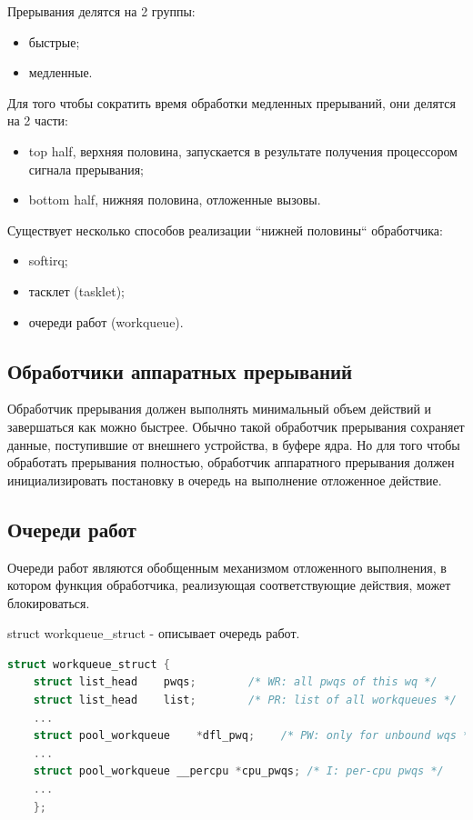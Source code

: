 Прерывания делятся на 2 группы:

\begin{itemize}
	\item быстрые;
	\item медленные. 
\end{itemize}

Для того чтобы сократить время обработки медленных прерываний, они делятся на 2 части:

\begin{itemize}
	\item top half, верхняя половина, запускается в результате получения процессором сигнала прерывания;
	\item bottom half, нижняя половина, отложенные вызовы.
\end{itemize}

Существует несколько способов реализации “нижней половины“
обработчика: 
\begin{itemize}
	\item softirq;
	\item тасклет (tasklet);
	\item очереди работ (workqueue).
\end{itemize}

\subsection{Обработчики аппаратных прерываний}

Обработчик прерывания должен выполнять минимальный объем действий и завершаться как можно быстрее.
Обычно такой обработчик прерывания сохраняет данные, поступившие от внешнего устройства, в буфере ядра. 
Но для того чтобы обработать прерывания полностью, обработчик аппаратного прерывания должен 
инициализировать постановку в очередь на выполнение отложенное действие.

\subsection{Очереди работ}

Очереди работ являются обобщенным механизмом отложенного выполнения, в котором 
функция обработчика, реализующая соответствующие действия, может блокироваться.

struct workqueue\_struct - описывает очередь работ.

\begin{lstlisting}[language=c, label=some-code, caption=Структура workqueue\_struct]
struct workqueue_struct {
	struct list_head    pwqs;        /* WR: all pwqs of this wq */
	struct list_head    list;        /* PR: list of all workqueues */
	...
	struct pool_workqueue    *dfl_pwq;    /* PW: only for unbound wqs */
	...
	struct pool_workqueue __percpu *cpu_pwqs; /* I: per-cpu pwqs */
	...
	};
\end{lstlisting}

